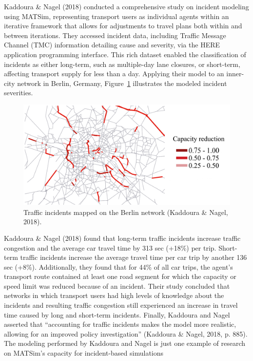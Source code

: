 \documentclass[fancy, oneside, mastersfancy, ms]{byuthesis}
\begin{document}
Kaddoura \& Nagel (2018) conducted a comprehensive study on incident
modeling using MATSim, representing transport users as individual agents
within an iterative framework that allows for adjustments to travel
plans both within and between iterations. They accessed incident data,
including Traffic Message Channel (TMC) information detailing cause and
severity, via the HERE application programming interface. This rich
dataset enabled the classification of incidents as either long-term,
such as multiple-day lane closures, or short-term, affecting transport
supply for less than a day. Applying their model to an inner-city
network in Berlin, Germany, Figure~\ref{fig-berlin_cap} illustrates the
modeled incident severities.

\begin{figure}

{\centering \includegraphics{figures/berlin_capacity.png}

}

\caption{\label{fig-berlin_cap}Traffic incidents mapped on the Berlin
network (Kaddoura \& Nagel, 2018).}

\end{figure}

Kaddoura \& Nagel (2018) found that long-term traffic incidents increase
traffic congestion and the average car travel time by 313 sec (+18\%)
per trip. Short-term traffic incidents increase the average travel time
per car trip by another 136 sec (+8\%). Additionally, they found that
for 44\% of all car trips, the agent's transport route contained at
least one road segment for which the capacity or speed limit was reduced
because of an incident. Their study concluded that networks in which
transport users had high levels of knowledge about the incidents and
resulting traffic congestion still experienced an increase in travel
time caused by long and short-term incidents. Finally, Kaddoura and
Nagel asserted that ``accounting for traffic incidents makes the model
more realistic, allowing for an improved policy investigation''
(Kaddoura \& Nagel, 2018, p. 885). The modeling performed by Kaddoura
and Nagel is just one example of research on MATSim's capacity for
incident-based simulations
\end{document}
